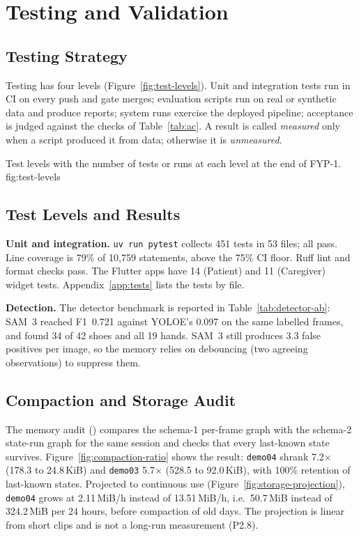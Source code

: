 \chapter{Testing and Validation}
\label{chap:testing}

\section{Testing Strategy}
Testing has four levels (Figure~\ref{fig:test-levels}). Unit and integration
tests run in CI on every push and gate merges; evaluation scripts run on real or
synthetic data and produce reports; system runs exercise the deployed pipeline;
acceptance is judged against the checks of Table~\ref{tab:ac}. A result is
called \emph{measured} only when a script produced it from data; otherwise it is
\emph{unmeasured}.

  {Test levels with the number of tests or runs at each level at the end of FYP-1.}
  {fig:test-levels}

\section{Test Levels and Results}
\textbf{Unit and integration.} \texttt{uv run pytest} collects 451 tests in 53
files; all pass. Line coverage is 79\% of 10{,}759 statements, above the 75\% CI
floor. Ruff lint and format checks pass. The Flutter apps have 14 (Patient) and
11 (Caregiver) widget tests. Appendix~\ref{app:tests} lists the tests by file.

\textbf{Detection.} The detector benchmark is reported in
Table~\ref{tab:detector-ab}: SAM~3 reached F1~0.721 against YOLOE's 0.097 on
the same labelled frames, and found 34 of 42 shoes and all 19 hands. SAM~3 still
produces 3.3 false positives per image, so the memory relies on debouncing (two
agreeing observations) to suppress them.

\section{Compaction and Storage Audit}
\label{sec:compaction-audit}
The memory audit () compares the schema-1
per-frame graph with the schema-2 state-run graph for the same session and
checks that every last-known state survives. Figure~\ref{fig:compaction-ratio}
shows the result: \texttt{demo04} shrank 7.2$\times$ (178.3 to 24.8\,KiB) and
\texttt{demo03} 5.7$\times$ (528.5 to 92.0\,KiB), with 100\% retention of
last-known states. Projected to continuous use (Figure~\ref{fig:storage-projection}),
\texttt{demo04} grows at 2.11\,MiB/h instead of 13.51\,MiB/h, i.e.\ 50.7\,MiB
instead of 324.2\,MiB per 24 hours, before compaction of old days. The projection
is linear from short clips and is not a long-run measurement (P2.8).

